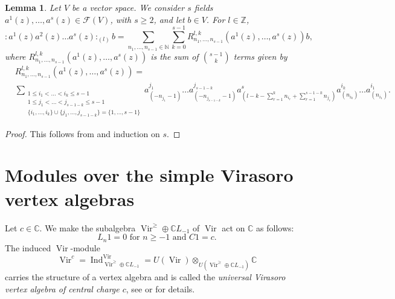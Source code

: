 \documentclass[a4paper, 12pt, reqno]{amsart}
\newtheorem{lemma}[theorem]{Lemma}
\theoremstyle{remark}
\DeclareMathOperator{\Vir}{Vir}
\DeclareMathOperator{\Ind}{Ind}
\begin{document}
\begin{lemma}
  \label{lmm:2}
  Let $V$ be a vector space.
  We consider $s$ fields $a^1(z), \dots, a^s(z) \in \mathcal{F}(V)$, with $s \ge 2$, and let $b \in V$.
  For $l \in \mathbb{Z}$,
  \begin{equation*}
    :a^1(z)a^2(z)\dots a^s(z):_{(l)}b = \sum_{n_1, \dots, n_{s - 1} \in \mathbb{N}}\sum_{k = 0}^{s - 1}R^{l, k}_{n_1, \dots, n_{s - 1}}(a^1(z), \dots, a^s(z))b,
  \end{equation*}
  where $R^{l, k}_{n_1, \dots, n_{s - 1}}(a^1(z), \dots, a^s(z))$ is the sum of $\binom{s - 1}{k}$ terms given by
  \begin{align*}
    &R^{l, k}_{n_1, \dots, n_{s - 1}}(a^1(z), \dots, a^s(z)) = \\
    &\sum_{\substack{1 \le i_1 < \dots < i_k \le s - 1 \\ 1 \le j_1 < \dots < j_{s - 1 - k} \le s - 1 \\ \{i_1, \dots, i_k\} \cup \{j_1, \dots, j_{s - 1 - k}\} = \{1, \dots, s - 1\}}}a^{j_1}_{(-n_{j_1} - 1)}\dots a^{j_{s - 1 - k}}_{(-n_{j_{s - 1 - k}} - 1)}a^s_{(l - k - \sum_{r = 1}^kn_{i_r} + \sum_{r = 1}^{s - 1 - k}n_{j_r})}a^{i_k}_{(n_{i_k})}\dots a^{i_1}_{(n_{i_1})}.
  \end{align*}
\end{lemma}

\begin{proof}
  This follows from  and induction on $s$.
\end{proof}

\section{Modules over the simple Virasoro vertex algebras}
\label{sec:modules-over-simple}

Let $c \in \mathbb{C}$.
We make the subalgebra $\Vir^{\ge} \oplus \mathbb{C}L_{-1}$ of $\Vir$ act on $\mathbb{C}$ as follows:
\begin{equation*}
  \text{$L_n1 = 0$ for $n \ge -1$ and $C1 = c$}.
\end{equation*}
The induced $\Vir$-module
\begin{equation*}
  \Vir^c = \Ind^{\Vir}_{\Vir^{\ge} \oplus \mathbb{C}L_{-1}} = U(\Vir) \otimes_{U(\Vir^{\ge} \oplus \mathbb{C}L_{-1})} \mathbb{C}
\end{equation*}
carries the structure of a vertex algebra and is called the \emph{universal Virasoro vertex algebra of central charge $c$}, see \cite[\S2]{frenkel_vertex_2001} or \cite[\S2]{callegaro_introduction_2017-1} for details.
\end{document}

